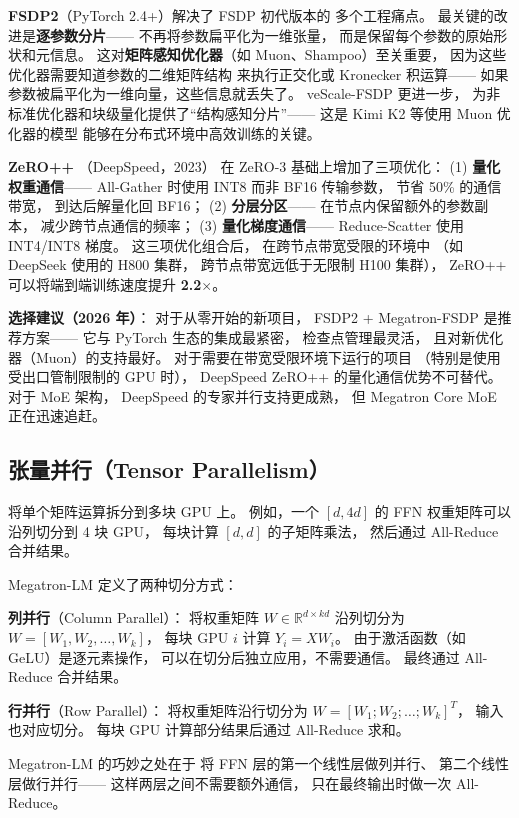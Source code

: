 \textbf{FSDP2}（PyTorch 2.4+）解决了 FSDP 初代版本的
多个工程痛点。
最关键的改进是\textbf{逐参数分片}——
不再将参数扁平化为一维张量，
而是保留每个参数的原始形状和元信息。
这对\textbf{矩阵感知优化器}（如 Muon、Shampoo）至关重要，
因为这些优化器需要知道参数的二维矩阵结构
来执行正交化或 Kronecker 积运算——
如果参数被扁平化为一维向量，这些信息就丢失了。
veScale-FSDP 更进一步，
为非标准优化器和块级量化提供了``结构感知分片''——
这是 Kimi K2 等使用 Muon 优化器的模型
能够在分布式环境中高效训练的关键。

\textbf{ZeRO++ }（DeepSpeed，2023）
在 ZeRO-3 基础上增加了三项优化：
(1) \textbf{量化权重通信}——
All-Gather 时使用 INT8 而非 BF16 传输参数，
节省 50\% 的通信带宽，
到达后解量化回 BF16；
(2) \textbf{分层分区}——
在节点内保留额外的参数副本，
减少跨节点通信的频率；
(3) \textbf{量化梯度通信}——
Reduce-Scatter 使用 INT4/INT8 梯度。
这三项优化组合后，
在跨节点带宽受限的环境中
（如 DeepSeek 使用的 H800 集群，
跨节点带宽远低于无限制 H100 集群），
ZeRO++ 可以将端到端训练速度提升 \textbf{2.2$\times$}。

\textbf{选择建议（2026 年）}：
对于从零开始的新项目，
FSDP2 + Megatron-FSDP 是推荐方案——
它与 PyTorch 生态的集成最紧密，
检查点管理最灵活，
且对新优化器（Muon）的支持最好。
对于需要在带宽受限环境下运行的项目
（特别是使用受出口管制限制的 GPU 时），
DeepSpeed ZeRO++ 的量化通信优势不可替代。
对于 MoE 架构，
DeepSpeed 的专家并行支持更成熟，
但 Megatron Core MoE 正在迅速追赶。

\subsection{张量并行（Tensor Parallelism）}

将单个矩阵运算拆分到多块 GPU 上。
例如，一个 $[d, 4d]$ 的 FFN 权重矩阵可以沿列切分到 4 块 GPU，
每块计算 $[d, d]$ 的子矩阵乘法，
然后通过 All-Reduce 合并结果。

Megatron-LM 定义了两种切分方式：

\textbf{列并行}（Column Parallel）：
将权重矩阵 $W \in \mathbb{R}^{d \times kd}$ 沿列切分为
$W = [W_1, W_2, \ldots, W_k]$，
每块 GPU $i$ 计算 $Y_i = XW_i$。
由于激活函数（如 GeLU）是逐元素操作，
可以在切分后独立应用，不需要通信。
最终通过 All-Reduce 合并结果。

\textbf{行并行}（Row Parallel）：
将权重矩阵沿行切分为 $W = [W_1; W_2; \ldots; W_k]^T$，
输入也对应切分。
每块 GPU 计算部分结果后通过 All-Reduce 求和。

Megatron-LM 的巧妙之处在于
将 FFN 层的第一个线性层做列并行、
第二个线性层做行并行——
这样两层之间不需要额外通信，
只在最终输出时做一次 All-Reduce。

